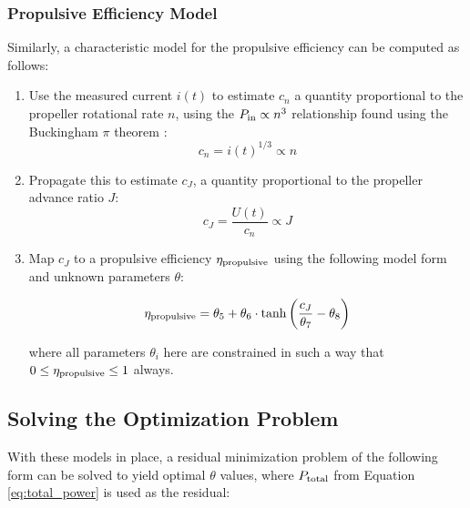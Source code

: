 \documentclass[conf]{new-aiaa}
\begin{document}
    \subsubsection{Propulsive Efficiency Model}
    \label{subsubsec:propulsive_efficiency_model}

    Similarly, a characteristic model for the propulsive efficiency can be computed as follows:

    \begin{enumerate}
        \item Use the measured current $i(t)$ to estimate $c_n$ a quantity proportional to the propeller rotational rate $n$, using the $P_{\rm in}\propto n^3$ relationship found using the Buckingham $\pi$ theorem \cite{unified_propellers}:
        \begin{equation*}
            c_n = i(t)^{1/3} \propto n
        \end{equation*}
        \item Propagate this to estimate $c_J$, a quantity proportional to the propeller advance ratio $J$:
        \begin{equation*}
            c_J = \frac{U(t)}{c_n} \propto J
        \end{equation*}
        \item Map $c_J$ to a propulsive efficiency $\eta_{\rm propulsive}$ using the following model form and unknown parameters $\theta$:

        \begin{equation*}
            \eta_{\rm propulsive} =
            \theta_5
            + \theta_6 \cdot \tanh \left(
            \frac{c_J}{\theta_7} - \theta_8
            \right)
        \end{equation*}

        \noindent where all parameters $\theta_i$ here are constrained in such a way that $0 \leq \eta_{\rm propulsive} \leq 1$ always.

    \end{enumerate}

    \subsection{Solving the Optimization Problem}
    \label{subsec:solving_optimization_problem}

    With these models in place, a residual minimization problem of the following form can be solved to yield optimal $\theta$ values, where $P_{\rm total}$ from Equation \ref{eq:total_power} is used as the residual:
\end{document}
